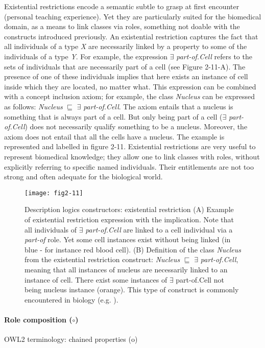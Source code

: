 Existential restrictions encode a semantic subtle to grasp at first encounter (personal teaching experience). Yet they are particularly suited for the biomedical domain, as a means to link classes via roles, something not doable with the constructs introduced previously. An existential restriction captures the fact that all individuals of a type \emph{X} are necessarily linked by a property to some of the individuals of a type \emph{Y}. For example, the expression $ \exists $ \emph{part-of.Cell} refers to the sets of individuals that are necessarily part of a cell (see Figure 2-11-A). The presence of one of these individuals implies that here exists an instance of cell inside which they are located, no matter what. This expression can be combined with a concept inclusion axiom; for example, the class \emph{Nucleus} can be expressed as follows: \emph{Nucleus} $ \sqsubseteq $ $ \exists $ \emph{part-of.Cell}. The axiom entails that a nucleus is something that is always part of a cell. But only being part of a cell ($ \exists $ \emph{part-of.Cell}) does not necessarily qualify something to be a nucleus. Moreover, the axiom does not entail that all the cells have a nucleus. The example is represented and labelled in figure 2-11. Existential restrictions are very useful to represent biomedical knowledge; they allow one to link classes with roles, without explicitly referring to specific named individuals. Their entitlements are not too strong and often adequate for the biological world.

\begin{figure}[H]
    \centering
    \texttt{[image: fig2-11]}
    \caption{Description logics constructors: existential restriction (A) Example of existential restriction expression with the implication. Note that all individuals of $ \exists $ \emph{part-of.Cell} are linked to a cell individual via a \emph{part-of} role. Yet some cell instances exist without being linked (in blue - for instance red blood cell). (B) Definition of the class \emph{Nucleus} from the existential restriction construct: \emph{Nucleus} $ \sqsubseteq $ $ \exists $ \emph{part-of.Cell}, meaning that all instances of nucleus are necessarily linked to an instance of cell. There exist some instances of $ \exists $ part-of.Cell not being nucleus instance (orange). This type of construct is commonly encountered in biology (e.g. \cite{ashburner2000gene}).}
    \label{fig2-11}
\end{figure}

\paragraph{\textbf{Role composition ($ \circ $)}\\}
OWL2 terminology: chained properties (o)

